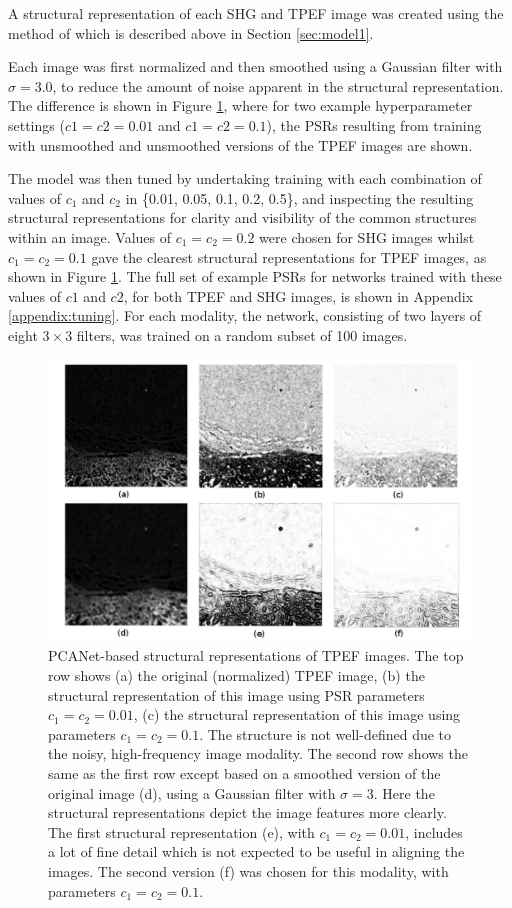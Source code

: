 \documentclass{report}
\begin{document}
A structural representation of each SHG and TPEF image was created using the method of \cite{zhu2018pcanet} which is described above in Section \ref{sec:model1}.

Each image was first normalized and then smoothed using a Gaussian filter with $\sigma=3.0$, to reduce the amount of noise apparent in the structural representation. The difference is shown in Figure \ref{fig:tuningPSR}, where for two example hyperparameter settings ($c1=c2=0.01$ and $c1=c2=0.1$), the PSRs resulting from training with unsmoothed and unsmoothed versions of the TPEF images are shown. 

The model was then tuned by undertaking training with each combination of values of $c_1$ and $c_2$ in \{0.01, 0.05, 0.1, 0.2, 0.5\}, and inspecting the resulting structural representations for clarity and visibility of the common structures within an image.
Values of $c_1=c_2=0.2$ were chosen for SHG images whilst $c_1=c_2=0.1$ gave the clearest structural representations for TPEF images, as shown in Figure \ref{fig:tuningPSR}. The full set of example PSRs for networks trained with these values of $c1$ and $c2$, for both TPEF and SHG images, is shown in Appendix \ref{appendix:tuning}. For each modality, the network, consisting of two layers of eight $3 \times 3$ filters, was trained on a random subset of 100 images.

\begin{figure}
\centering
\includegraphics[width=5.75in]{tuning_tpef_148185_11.pdf}
\caption{PCANet-based structural representations of TPEF images. The top row shows (a) the original (normalized) TPEF image, (b) the structural representation of this image using PSR parameters $c_1=c_2=0.01$, (c) the structural representation of this image using parameters $c_1=c_2=0.1$. The structure is not well-defined due to the noisy, high-frequency image modality. The second row shows the same as the first row except based on a smoothed version of the original image (d), using a Gaussian filter with $\sigma=3$. Here the structural representations depict the image features more clearly. The first structural representation (e), with $c_1=c_2=0.01$, includes a lot of fine detail which is not expected to be useful in aligning the images. The second version (f) was chosen for this modality, with parameters $c_1=c_2=0.1$.}
\label{fig:tuningPSR}
\end{figure}
\end{document}

